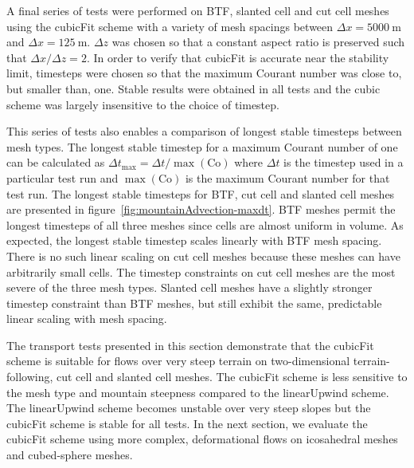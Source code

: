 A final series of tests were performed on BTF, slanted cell and cut cell meshes using the cubicFit scheme with a variety of mesh spacings between $\Delta x = \SI{5000}{\meter}$ and $\Delta x = \SI{125}{\meter}$.  $\Delta z$ was chosen so that a constant aspect ratio is preserved such that $\Delta x / \Delta z = 2$.  In order to verify that cubicFit is accurate near the stability limit, timesteps were chosen so that the maximum Courant number was close to, but smaller than, one.  Stable results were obtained in all tests and the cubic scheme was largely insensitive to the choice of timestep.

This series of tests also enables a comparison of longest stable timesteps between mesh types.  The longest stable timestep for a maximum Courant number of one can be calculated as $\Delta t_\mathrm{max} = \Delta t / \max(\mathrm{Co})$ where $\Delta t$ is the timestep used in a particular test run and $\max(\mathrm{Co})$ is the maximum Courant number for that test run.
The longest stable timesteps for BTF, cut cell and slanted cell meshes are presented in figure~\ref{fig:mountainAdvection-maxdt}.  BTF meshes permit the longest timesteps of all three meshes since cells are almost uniform in volume.  As expected, the longest stable timestep scales linearly with BTF mesh spacing.
There is no such linear scaling on cut cell meshes because these meshes can have arbitrarily small cells.  The timestep constraints on cut cell meshes are the most severe of the three mesh types.  Slanted cell meshes have a slightly stronger timestep constraint than BTF meshes, but still exhibit the same, predictable linear scaling with mesh spacing.

The transport tests presented in this section demonstrate that the cubicFit scheme is suitable for flows over very steep terrain on two-dimensional terrain-following, cut cell and slanted cell meshes.  The cubicFit scheme is less sensitive to the mesh type and mountain steepness compared to the linearUpwind scheme.  The linearUpwind scheme becomes unstable over very steep slopes but the cubicFit scheme is stable for all tests.  In the next section, we evaluate the cubicFit scheme using more complex, deformational flows on icosahedral meshes and cubed-sphere meshes.
